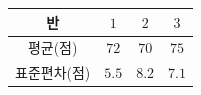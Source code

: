 {\renewcommand{\arraystretch}{1.35}\small
\begin{tabular}{|c|c|c|c|}
\hline
반 & $1$ & $2$ & $3$ \\ \hline
평균(점) & $72$ & $70$ & $75$ \\ \hline
표준편차(점) & $5.5$ & $8.2$ & $7.1$ \\ \hline
\end{tabular}}
